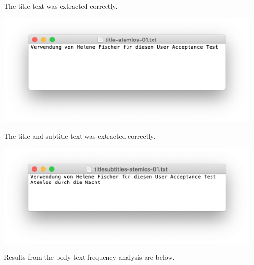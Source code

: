 \documentclass{article}
\begin{document}
The title text was extracted correctly.

\includegraphics[width=\textwidth]{uat05.png}

The title and subtitle text was extracted correctly.

\includegraphics[width=\textwidth]{uat06.png}

Results from the body text frequency analysis are below.
\end{document}
